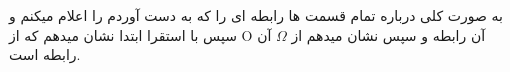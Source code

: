 
% 
\problem{}
به صورت کلی درباره تمام قسمت ها رابطه ای را که به دست آوردم را اعلام میکنم و سپس با استقرا 
ابتدا نشان میدهم که از O آن رابطه و 
سپس نشان میدهم از $\Omega$ آن رابطه است.
\\\\















% 
